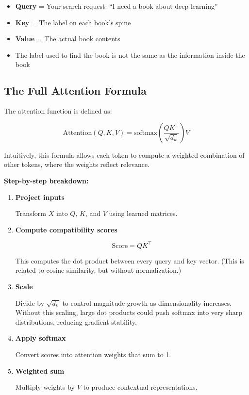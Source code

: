 \documentclass[11pt]{article}
\begin{document}
\begin{examplebox}

\begin{itemize}[nosep]
  \item \textbf{Query} = Your search request: ``I need a book about deep learning''
  \item \textbf{Key} = The label on each book's spine
  \item \textbf{Value} = The actual book contents
  \item The label used to find the book is not the same as the information inside the book
\end{itemize}

\end{examplebox}

\subsection{The Full Attention Formula}

The attention function is defined as:

\begin{equation}
\boxed{
\text{Attention}(Q,K,V)
=
\text{softmax}
\left(
\frac{QK^\top}{\sqrt{d_k}}
\right)V
}
\label{eq:attention}
\end{equation}

\noindent
Intuitively, this formula allows each token to compute a weighted combination of other tokens, where the weights reflect relevance.

\noindent\textbf{Step-by-step breakdown:}

\begin{enumerate}[nosep]

\item \textbf{Project inputs}

Transform $X$ into $Q$, $K$, and $V$ using learned matrices.

\item \textbf{Compute compatibility scores}

\[
\text{Score} = QK^\top
\]

This computes the dot product between every query and key vector. (This is related to cosine similarity, but without normalization.)

\item \textbf{Scale}

Divide by $\sqrt{d_k}$ to control magnitude growth as dimensionality increases. Without this scaling, large dot products could push softmax into very sharp distributions, reducing gradient stability.

\item \textbf{Apply softmax}

Convert scores into attention weights that sum to 1.

\item \textbf{Weighted sum}

Multiply weights by $V$ to produce contextual representations.

\end{enumerate}
\end{document}
